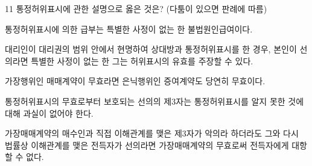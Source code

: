\begin{question}{11}
통정허위표시에 관한 설명으로 옳은 것은? (다툼이 있으면 판례에 따름)
\begin{choices}
  \item 통정허위표시에 의한 급부는 특별한 사정이 없는 한 불법원인급여이다.
  \item 대리인이 대리권의 범위 안에서 현명하여 상대방과 통정허위표시를 한 경우, 본인이 선의라면 특별한 사정이 없는 한 그는 허위표시의 유효를 주장할 수 있다.
  \item 가장행위인 매매계약이 무효라면 은닉행위인 증여계약도 당연히 무효이다.
  \item 통정허위표시의 무효로부터 보호되는 선의의 제3자는 통정허위표시를 알지 못한 것에 대해 과실이 없어야 한다.
  \item 가장매매계약의 매수인과 직접 이해관계를 맺은 제3자가 악의라 하더라도 그와 다시 법률상 이해관계를 맺은 전득자가 선의라면 가장매매계약의 무효로써 전득자에게 대항할 수 없다.
\end{choices}
\end{question}
